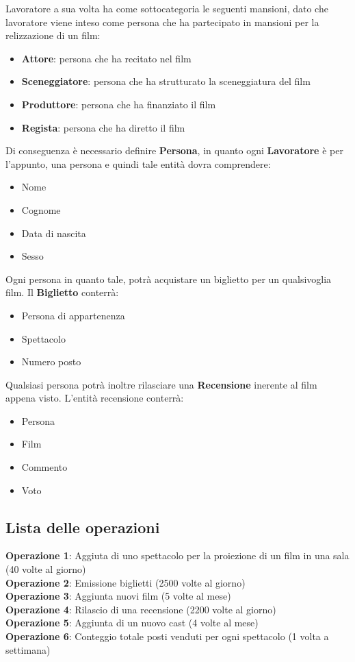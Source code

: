 \documentclass[10pt]{article}
\begin{document}
	Lavoratore a sua volta ha come sottocategoria le seguenti mansioni, dato che lavoratore viene inteso come persona che ha partecipato in mansioni per la relizzazione di un film:
	\begin{itemize}
		\item {\bf Attore}: persona che ha recitato nel film 
		\item {\bf Sceneggiatore}: persona che ha strutturato la sceneggiatura del film 
		\item {\bf Produttore}: persona che ha finanziato il film 
		\item {\bf Regista}: persona che ha diretto il film
	\end{itemize}		 
	Di conseguenza è necessario definire {\bf Persona}, in quanto ogni {\bf Lavoratore} è per l'appunto, una persona e quindi tale entità dovra comprendere:
	\begin{itemize}
		\item Nome
		\item Cognome
		\item Data di nascita
		\item Sesso
	\end{itemize}
	Ogni persona in quanto tale, potrà acquistare un biglietto per un qualsivoglia film. Il {\bf Biglietto} conterrà:
	\begin{itemize}
		\item Persona di appartenenza
		\item Spettacolo
		\item Numero posto
	\end{itemize}
	Qualsiasi persona potrà inoltre rilasciare una {\bf Recensione} inerente al film appena visto. L'entità recensione conterrà:
	\begin{itemize}
		\item Persona
		\item Film
		\item Commento
		\item Voto
	\end{itemize}
 	\subsection{Lista delle operazioni}		
	\textbf{Operazione 1}: Aggiuta di uno spettacolo per la proiezione di un film in una sala (40 volte al giorno) \\
	\textbf{Operazione 2}: Emissione biglietti (2500 volte al giorno)\\
	\textbf{Operazione 3}: Aggiunta nuovi film (5 volte al mese)\\
	\textbf{Operazione 4}: Rilascio di una recensione (2200 volte al giorno)\\
	\textbf{Operazione 5}: Aggiunta di un nuovo cast (4 volte al mese)\\
	\textbf{Operazione 6}: Conteggio totale posti venduti per ogni spettacolo (1 volta a settimana)
\end{document}
